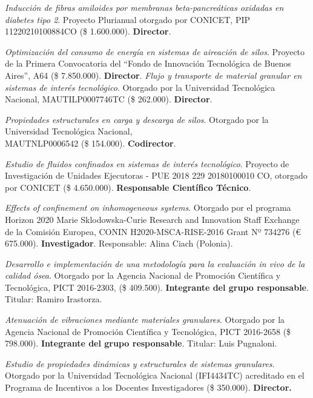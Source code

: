 \begin{timeline}
 \textit{Inducción de fibras amiloides por membranas beta-pancreáticas oxidadas en diabetes tipo 2}. Proyecto Plurianual otorgado por CONICET, PIP 11220210100884CO (\$ 1.600.000). \textbf{Director}.

 \textit{Optimización del consumo de energía en sistemas de aireación de silos}. Proyecto de la Primera Convocatoria del ``Fondo de Innovación Tecnológica de Buenos Aires'', A64 (\$ 7.850.000). \textbf{Director}.
 \textit{Flujo y transporte de material granular en sistemas de interés tecnológico}. Otorgado por la Universidad Tecnológica Nacional, MAUTILP0007746TC (\$ 262.000). \textbf{Director}.

 \textit{Propiedades estructurales en carga y descarga de silos}. Otorgado por la Universidad Tecnológica Nacional,\\ MAUTNLP0006542 (\$ 154.000). \textbf{Codirector}.

 \textit{Estudio de fluidos confinados en sistemas de interés tecnológico}. Proyecto de Investigación de Unidades Ejecutoras - PUE 2018 229 20180100010 CO, otorgado por CONICET (\$ 4.650.000). \textbf{Responsable Científico Técnico}.

 \textit{Effects of confinement on inhomogeneous systems}. Otorgado por el programa Horizon 2020 Marie Sklodowska-Curie Research and Innovation Staff Exchange de la Comisión Europea, CONIN H2020-MSCA-RISE-2016 Grant Nº 734276 (€ 675.000). \textbf{Investigador}. Responsable: Alina Ciach (Polonia).

 \textit{Desarrollo e implementación de una metodología para la evaluación \textit{in vivo} de la calidad ósea}. Otorgado por la Agencia Nacional de Promoción Científica y Tecnológica, PICT 2016-2303, (\$ 409.500). \textbf{Integrante del grupo responsable}. Titular: Ramiro Irastorza.

 \textit{Atenuación de vibraciones mediante materiales granulares}. Otorgado por la Agencia Nacional de Promoción Científica y Tecnológica, PICT 2016-2658 (\$ 798.000). \textbf{Integrante del grupo responsable}. Titular: Luis Pugnaloni.

 \textit{Estudio de propiedades dinámicas y estructurales de sistemas granulares}. Otorgado por la Universidad Tecnológica Nacional (IFI4434TC) acreditado en el Programa de Incentivos a los Docentes Investigadores (\$ 350.000). \textbf{Director.}


\end{timeline}
